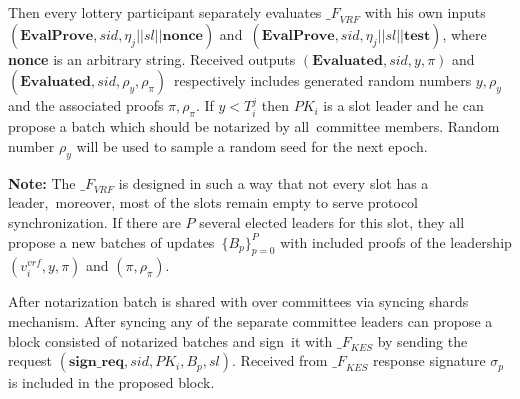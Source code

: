 \begin{enumerate}[listparindent=0.5cm,
    align=left]
    Then every lottery participant separately evaluates ${\mathcal_{F}}_{VRF}$ with his own inputs\
    ${(\textbf{EvalProve}, sid, \eta_j || sl || \textbf{nonce})}$ and\
    ${(\textbf{EvalProve}, sid, \eta_j || sl || \textbf{test})}$, where \textbf{nonce} is an arbitrary string.
    Received outputs ${(\textbf{Evaluated}, sid, y, \pi)}$ and ${(\textbf{Evaluated}, sid, \rho_y, \rho_\pi)}$\
    respectively includes generated random numbers ${y, \rho_y}$ and the associated proofs ${\pi, \rho_\pi}$.
    If ${y < T_i^j}$ then $PK_i$ is a slot leader and he can propose a batch which should be notarized by all\
    committee members.
    Random number $\rho_y$ will be used to sample a random seed for the next epoch.

    \textbf{Note:} The ${\mathcal_{F}}_{VRF}$ is designed in such a way that not every slot has a leader,\
    moreover, most of the slots remain empty to serve protocol synchronization.
    If there are $P$ several elected leaders for this slot, they all propose a new batches of updates\
    $\{B_p\}_{p=0}^P$ with included proofs of the leadership ${(v_i^{vrf}, y, \pi)}$ and ${(\pi, \rho_\pi)}$.

    After notarization batch is shared with over committees via syncing shards mechanism.
    After syncing any of the separate committee leaders can propose a block consisted of notarized batches and sign\
    it with ${\mathcal_{F}}_{KES}$ by sending the request ${(\textbf{sign\_req}, sid, PK_i, B_p, sl)}$.
    Received from ${\mathcal_{F}}_{KES}$ response signature $\sigma_p$ is included in the proposed block.

\end{enumerate}